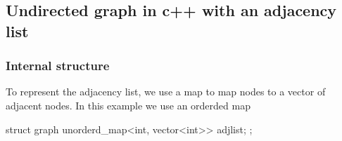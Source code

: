 \documentclass{report}
\begin{document}
%

\pagebreak 
\subsection{Undirected graph in c++ with an adjacency list}
\bigbreak \noindent 
\subsubsection{Internal structure}
\bigbreak \noindent 
To represent the adjacency list, we use a map to map nodes to a vector of adjacent nodes. In this example we use an orderded map
\bigbreak \noindent 
\begin{cppcode}
    struct graph {
        unorderd_map<int, vector<int>> adjlist;
    };
\end{cppcode}
\bigbreak \noindent 
\end{document}
